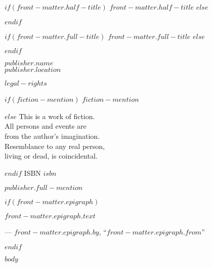 \documentclass[v2,$lang$]{novel} %
\begin{document}
\frontmatter

\thispagestyle{empty}
$if(front-matter.half-title)$
$front-matter.half-title$
$else$
\vspace*{6\nbs}
\hfill\charscale[2.4]{\textbf{\theTitle}}\par
$endif$
\clearpage

\thispagestyle{empty}
\null
\clearpage

\thispagestyle{empty}
\vspace*{5\nbs}
\begin{center}
$if(front-matter.full-title)$
$front-matter.full-title$
$else$
\charscale[3.6]{\textbf{\theTitle}}\par
$endif$
\vspace{1.5\nbs}
\charscale[1.6]{\theSubtitle}\par
\vspace{4\nbs}
\vspace{4\nbs}
{\theAuthor}
\vfill
{ $publisher.name$\\
$publisher.location$}\par

\end{center}
\clearpage


\thispagestyle{empty}
\begin{center}
\itshape{
\null
\vfill
\textsc{\theTitle}\par
\par

$legal-rights$\par
\null
$if(fiction-mention)$
$fiction-mention$\par
$else$
This is a work of fiction.\\
All persons and events are\\
from the author's imagination.\\
Resemblance to any real person,\\
living or dead, is coincidental.\par
$endif$
\null
ISBN $isbn$\par %
\null

$publisher.full-mention$
} %
\end{center}
\clearpage


$if(front-matter.epigraph)$
\thispagestyle{empty}
\vspace*{7\nbs}
\begin{adjustwidth}{4em}{4em}
{\itshape \noindent $front-matter.epigraph.text$\par}
\hfill--- $front-matter.epigraph.by$, ``$front-matter.epigraph.from$''\par
\end{adjustwidth}
$endif$

$body$
\end{document}
